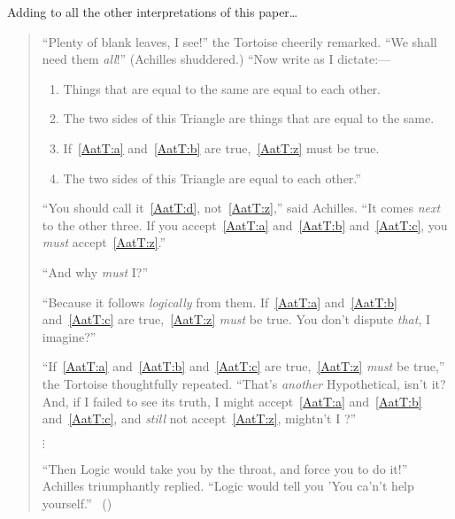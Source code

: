 \begin{note}
  \color{red}
  Adding to all the other interpretations of this paper\dots
\end{note}

\begin{note}
  \begin{quote}
    ``Plenty of blank leaves, I see!'' the Tortoise cheerily remarked.
    ``We shall need them \emph{all}!''
    (Achilles shuddered.)
    ``Now write as I dictate:---

    \begin{enumerate}[label=(\emph{\Alph*}), ref=\emph{\Alph*}]
    \item
      \label{AatT:a}
      Things that are equal to the same are equal to each other.
    \item
      \label{AatT:b}
      The two sides of this Triangle are things that are equal to the same.
    \item
      \label{AatT:c}
      If~\ref{AatT:a} and~\ref{AatT:b} are true,~\ref{AatT:z} must be true.
      \setcounter{enumi}{25}
    \item
      \label{AatT:z}
      The two sides of this Triangle are equal to each other.''
    \end{enumerate}

    ``You should call it~\ref{AatT:d}, not~\ref{AatT:z},'' said Achilles.
    ``It comes \emph{next} to the other three.
    If you accept~\ref{AatT:a} and~\ref{AatT:b} and~\ref{AatT:c}, you \emph{must} accept~\ref{AatT:z}.''

    ``And why \emph{must} I?''

    ``Because it follows \emph{logically} from them.
    If~\ref{AatT:a} and~\ref{AatT:b} and~\ref{AatT:c} are true,~\ref{AatT:z} \emph{must} be true.
    You don't dispute \emph{that}, I imagine?''

    ``If~\ref{AatT:a} and~\ref{AatT:b} and~\ref{AatT:c} are true,~\ref{AatT:z} \emph{must} be true,'' the Tortoise thoughtfully repeated.
    ``That's \emph{another} Hypothetical, isn't it?
    And, if I failed to see its truth, I might accept~\ref{AatT:a} and~\ref{AatT:b} and~\ref{AatT:c}, and \emph{still} not accept~\ref{AatT:z}, mightn't I ?''

    \mbox{}\hfill\(\vdots\)\hfill\mbox{}

    ``Then Logic would take you by the throat, and force you to do it!''
    Achilles triumphantly replied.
    ``Logic would tell you 'You ca'n't help yourself.''%
    \mbox{ }\hfill\mbox{(\citeyear[279--280]{Carroll:1895uj})}
  \end{quote}


\end{note}
